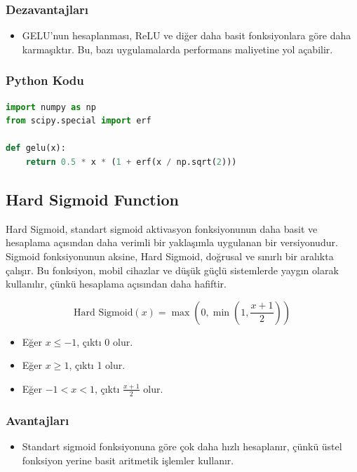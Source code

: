 \subsubsection{Dezavantajları}

\begin{itemize}
    \item GELU'nun hesaplanması, ReLU ve diğer daha basit fonksiyonlara göre daha karmaşıktır. Bu, bazı uygulamalarda performans maliyetine yol açabilir.
\end{itemize}

\subsubsection{Python Kodu}

\begin{lstlisting}[language=Python]
import numpy as np
from scipy.special import erf

def gelu(x):
    return 0.5 * x * (1 + erf(x / np.sqrt(2)))
\end{lstlisting}

\newpage

\subsection{Hard Sigmoid Function}

Hard Sigmoid, standart sigmoid aktivasyon fonksiyonunun daha basit ve hesaplama açısından daha verimli bir yaklaşımla uygulanan bir versiyonudur. Sigmoid fonksiyonunun aksine, Hard Sigmoid, doğrusal ve sınırlı bir aralıkta çalışır. Bu fonksiyon, mobil cihazlar ve düşük güçlü sistemlerde yaygın olarak kullanılır, çünkü hesaplama açısından daha hafiftir.

\[ \text{Hard Sigmoid}(x) = \max(0, \min(1, \frac{x + 1}{2})) \]

\begin{itemize}
    \item Eğer $x \leq -1$, çıktı 0 olur.
    \item Eğer $x \geq 1$, çıktı 1 olur.
    \item Eğer $-1 < x < 1$, çıktı $\frac{x + 1}{2}$ olur.
\end{itemize}

\subsubsection{Avantajları}

\begin{itemize}
    \item Standart sigmoid fonksiyonuna göre çok daha hızlı hesaplanır, çünkü üstel fonksiyon yerine basit aritmetik işlemler kullanır.
\end{itemize}

